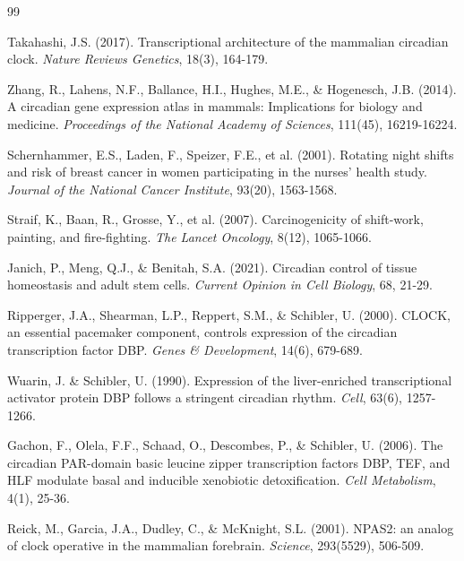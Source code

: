 \documentclass[10pt,letterpaper]{article}
\begin{document}

\begin{thebibliography}{99}

Takahashi, J.S. (2017). Transcriptional architecture of the mammalian circadian clock. \textit{Nature Reviews Genetics}, 18(3), 164-179.

Zhang, R., Lahens, N.F., Ballance, H.I., Hughes, M.E., \& Hogenesch, J.B. (2014). A circadian gene expression atlas in mammals: Implications for biology and medicine. \textit{Proceedings of the National Academy of Sciences}, 111(45), 16219-16224.

Schernhammer, E.S., Laden, F., Speizer, F.E., et al. (2001). Rotating night shifts and risk of breast cancer in women participating in the nurses' health study. \textit{Journal of the National Cancer Institute}, 93(20), 1563-1568.

Straif, K., Baan, R., Grosse, Y., et al. (2007). Carcinogenicity of shift-work, painting, and fire-fighting. \textit{The Lancet Oncology}, 8(12), 1065-1066.

Janich, P., Meng, Q.J., \& Benitah, S.A. (2021). Circadian control of tissue homeostasis and adult stem cells. \textit{Current Opinion in Cell Biology}, 68, 21-29.

Ripperger, J.A., Shearman, L.P., Reppert, S.M., \& Schibler, U. (2000). CLOCK, an essential pacemaker component, controls expression of the circadian transcription factor DBP. \textit{Genes \& Development}, 14(6), 679-689.

Wuarin, J. \& Schibler, U. (1990). Expression of the liver-enriched transcriptional activator protein DBP follows a stringent circadian rhythm. \textit{Cell}, 63(6), 1257-1266.

Gachon, F., Olela, F.F., Schaad, O., Descombes, P., \& Schibler, U. (2006). The circadian PAR-domain basic leucine zipper transcription factors DBP, TEF, and HLF modulate basal and inducible xenobiotic detoxification. \textit{Cell Metabolism}, 4(1), 25-36.

Reick, M., Garcia, J.A., Dudley, C., \& McKnight, S.L. (2001). NPAS2: an analog of clock operative in the mammalian forebrain. \textit{Science}, 293(5529), 506-509.


\end{thebibliography}
\end{document}
